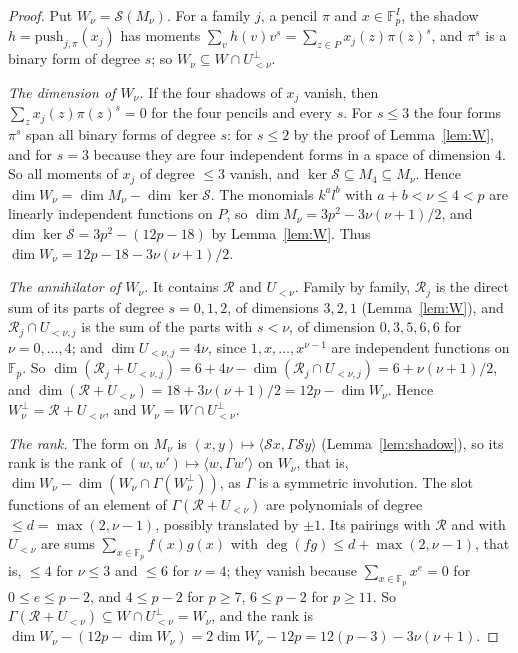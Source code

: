 \documentclass[11pt]{article}
\theoremstyle{definition}
\theoremstyle{remark}
\newcommand{\F}{\mathbb{F}}
\begin{document}
\begin{proof}
Put $W_\nu=\mathcal S(M_\nu)$. For a family $j$, a pencil $\pi$ and $x\in\F_p^I$, the shadow $h=\mathrm{push}_{j,\pi}(x_j)$ has moments $\sum_vh(v)v^s=\sum_{z\in P}x_j(z)\pi(z)^s$, and $\pi^s$ is a binary form of degree $s$; so $W_\nu\subseteq W\cap U_{<\nu}^\perp$.

\emph{The dimension of $W_\nu$.} If the four shadows of $x_j$ vanish, then $\sum_zx_j(z)\pi(z)^s=0$ for the four pencils and every $s$. For $s\le3$ the four forms $\pi^s$ span all binary forms of degree $s$: for $s\le2$ by the proof of Lemma~\ref{lem:W}, and for $s=3$ because they are four independent forms in a space of dimension $4$. So all moments of $x_j$ of degree $\le3$ vanish, and $\ker \mathcal S\subseteq M_4\subseteq M_\nu$. Hence $\dim W_\nu=\dim M_\nu-\dim\ker \mathcal S$. The monomials $k^al^b$ with $a+b<\nu\le4<p$ are linearly independent functions on $P$, so $\dim M_\nu=3p^2-3\nu(\nu+1)/2$, and $\dim\ker \mathcal S=3p^2-(12p-18)$ by Lemma~\ref{lem:W}. Thus $\dim W_\nu=12p-18-3\nu(\nu+1)/2$.

\emph{The annihilator of $W_\nu$.} It contains $\mathcal R$ and $U_{<\nu}$. Family by family, $\mathcal R_j$ is the direct sum of its parts of degree $s=0,1,2$, of dimensions $3,2,1$ (Lemma~\ref{lem:W}), and $\mathcal R_j\cap U_{<\nu,j}$ is the sum of the parts with $s<\nu$, of dimension $0,3,5,6,6$ for $\nu=0,\dots,4$; and $\dim U_{<\nu,j}=4\nu$, since $1,x,\dots,x^{\nu-1}$ are independent functions on $\F_p$. So $\dim(\mathcal R_j+U_{<\nu,j})=6+4\nu-\dim(\mathcal R_j\cap U_{<\nu,j})=6+\nu(\nu+1)/2$, and $\dim(\mathcal R+U_{<\nu})=18+3\nu(\nu+1)/2=12p-\dim W_\nu$. Hence $W_\nu^\perp=\mathcal R+U_{<\nu}$, and $W_\nu=W\cap U_{<\nu}^\perp$.

\emph{The rank.} The form on $M_\nu$ is $(x,y)\mapsto\langle \mathcal Sx,\Gamma \mathcal Sy\rangle$ (Lemma~\ref{lem:shadow}), so its rank is the rank of $(w,w')\mapsto\langle w,\Gamma w'\rangle$ on $W_\nu$, that is, $\dim W_\nu-\dim(W_\nu\cap\Gamma(W_\nu^\perp))$, as $\Gamma$ is a symmetric involution. The slot functions of an element of $\Gamma(\mathcal R+U_{<\nu})$ are polynomials of degree $\le d=\max(2,\nu-1)$, possibly translated by $\pm1$. Its pairings with $\mathcal R$ and with $U_{<\nu}$ are sums $\sum_{x\in\F_p}f(x)g(x)$ with $\deg(fg)\le d+\max(2,\nu-1)$, that is, $\le4$ for $\nu\le3$ and $\le6$ for $\nu=4$; they vanish because $\sum_{x\in\F_p}x^e=0$ for $0\le e\le p-2$, and $4\le p-2$ for $p\ge7$, $6\le p-2$ for $p\ge11$. So $\Gamma(\mathcal R+U_{<\nu})\subseteq W\cap U_{<\nu}^\perp=W_\nu$, and the rank is $\dim W_\nu-(12p-\dim W_\nu)=2\dim W_\nu-12p=12(p-3)-3\nu(\nu+1)$.
\end{proof}
\end{document}
